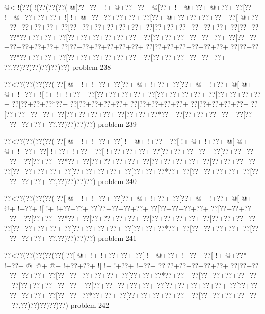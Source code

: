 \vbox{\vbox{\goo
\- @<\- !(\0??(\- !(\0??(\0??(\0??(
\- @[\0??+\0??+\- !+\- @+\0??+\0??+
\- @[\0??+\- !+\- @+\0??+\- @+\0??+
\0??[\0??+\- !+\- @+\0??+\0??+\0??+
\- ![\- !+\- @+\0??+\0??+\0??+\0??+
\0??[\0??+\- @+\0??+\0??+\0??+\0??+
\0??[\- @+\0??+\0??+\0??+\0??+\0??+
\0??[\0??+\0??+\0??+\0??+\0??+\0??+
\0??[\0??+\0??+\0??+\0??+\0??+\0??+
\0??[\0??+\0??+\0??*\0??+\0??+\0??+
\0??[\0??+\0??+\0??+\0??+\0??+\0??+
\0??[\0??+\0??+\0??+\0??+\0??+\0??+
\0??[\0??+\0??+\0??+\0??+\0??+\0??+
\0??[\0??+\0??+\0??+\0??+\0??+\0??+
\0??[\0??+\0??+\0??+\0??+\0??+\0??+
\0??[\0??+\0??+\0??*\0??+\0??+\0??+
\0??[\0??+\0??+\0??+\0??+\0??+\0??+
\0??[\0??+\0??+\0??+\0??+\0??+\0??+
\0??,\0??)\0??)\0??)\0??)\0??)\0??)
}
\hfil problem 238\hfil\break
}

\vbox{\vbox{\goo
\0??<\0??(\0??(\0??(\0??(
\0??[\- @+\- !+\- !+\0??+
\0??[\0??+\- @+\- !+\0??+
\0??[\0??+\- @+\- !+\0??+
\- @[\- @+\- @+\- !+\0??+
\- ![\- !+\- !+\- !+\0??+
\0??[\0??+\0??+\0??+\0??+
\0??[\0??+\0??+\0??+\0??+
\0??[\0??+\0??+\0??+\0??+
\0??[\0??+\0??+\0??*\0??+
\0??[\0??+\0??+\0??+\0??+
\0??[\0??+\0??+\0??+\0??+
\0??[\0??+\0??+\0??+\0??+
\0??[\0??+\0??+\0??+\0??+
\0??[\0??+\0??+\0??+\0??+
\0??[\0??+\0??+\0??*\0??+
\0??[\0??+\0??+\0??+\0??+
\0??[\0??+\0??+\0??+\0??+
\0??,\0??)\0??)\0??)\0??)
}
\hfil problem 239\hfil\break
}

\vbox{\vbox{\goo
\0??<\0??(\0??(\0??(\0??(
\0??[\- @+\- !+\- !+\0??+
\0??[\- !+\- @+\- !+\0??+
\0??[\- !+\- @+\- !+\0??+
\- @[\- @+\- @+\- !+\0??+
\0??[\- !+\0??+\- !+\0??+
\0??[\- !+\0??+\0??+\0??+
\0??[\0??+\0??+\0??+\0??+
\0??[\0??+\0??+\0??+\0??+
\0??[\0??+\0??+\0??*\0??+
\0??[\0??+\0??+\0??+\0??+
\0??[\0??+\0??+\0??+\0??+
\0??[\0??+\0??+\0??+\0??+
\0??[\0??+\0??+\0??+\0??+
\0??[\0??+\0??+\0??+\0??+
\0??[\0??+\0??+\0??*\0??+
\0??[\0??+\0??+\0??+\0??+
\0??[\0??+\0??+\0??+\0??+
\0??,\0??)\0??)\0??)\0??)
}
\hfil problem 240\hfil\break
}

\vbox{\vbox{\goo
\0??<\0??(\0??(\0??(\0??(
\0??[\- @+\- !+\- !+\0??+
\0??[\0??+\- @+\- !+\0??+
\0??[\0??+\- @+\- !+\0??+
\- @[\- @+\- @+\- !+\0??+
\- ![\- !+\- !+\0??+\0??+
\0??[\0??+\0??+\0??+\0??+
\0??[\0??+\0??+\0??+\0??+
\0??[\0??+\0??+\0??+\0??+
\0??[\0??+\0??+\0??*\0??+
\0??[\0??+\0??+\0??+\0??+
\0??[\0??+\0??+\0??+\0??+
\0??[\0??+\0??+\0??+\0??+
\0??[\0??+\0??+\0??+\0??+
\0??[\0??+\0??+\0??+\0??+
\0??[\0??+\0??+\0??*\0??+
\0??[\0??+\0??+\0??+\0??+
\0??[\0??+\0??+\0??+\0??+
\0??,\0??)\0??)\0??)\0??)
}
\hfil problem 241\hfil\break
}

\vbox{\vbox{\goo
\0??<\0??(\0??(\0??(\0??(\0??(
\0??[\- @+\- !+\- !+\0??+\0??+
\0??[\- !+\- @+\0??+\- !+\0??+
\0??[\- !+\- @+\0??*\- !+\0??+
\- @[\- @+\- @+\- !+\0??+\0??+
\- ![\- !+\- !+\0??+\- !+\0??+
\0??[\0??+\0??+\0??+\0??+\0??+
\0??[\0??+\0??+\0??+\0??+\0??+
\0??[\0??+\0??+\0??+\0??+\0??+
\0??[\0??+\0??+\0??*\0??+\0??+
\0??[\0??+\0??+\0??+\0??+\0??+
\0??[\0??+\0??+\0??+\0??+\0??+
\0??[\0??+\0??+\0??+\0??+\0??+
\0??[\0??+\0??+\0??+\0??+\0??+
\0??[\0??+\0??+\0??+\0??+\0??+
\0??[\0??+\0??+\0??*\0??+\0??+
\0??[\0??+\0??+\0??+\0??+\0??+
\0??[\0??+\0??+\0??+\0??+\0??+
\0??,\0??)\0??)\0??)\0??)\0??)
}
\hfil problem 242\hfil\break
}

